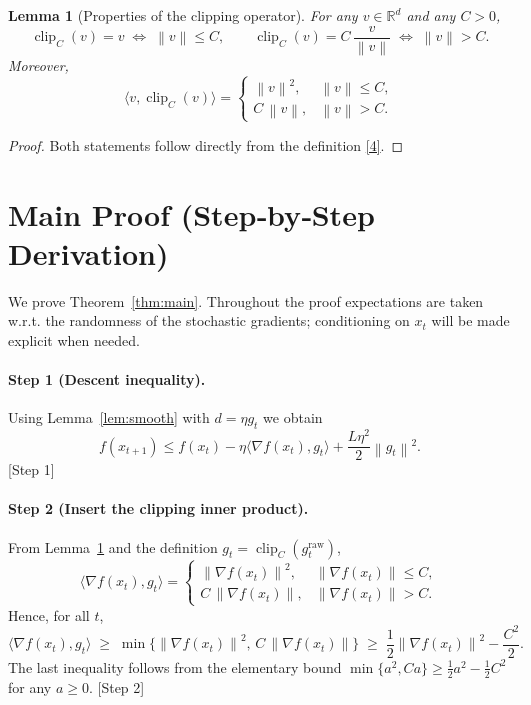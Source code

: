 \documentclass{article}
\newtheorem{lemma}{Lemma}
\newcommand{\norm}[1]{\left\lVert#1\right\rVert}
\begin{document}
\begin{lemma}[Properties of the clipping operator]\label{lem:clip}
For any $v\in\mathbb{R}^d$ and any $C>0$,
\[
\operatorname{clip}_C(v)=v\;\Longleftrightarrow\;\norm{v}\le C,
\qquad
\operatorname{clip}_C(v)=C\,\frac{v}{\norm{v}}\;\Longleftrightarrow\;\norm{v}>C .
\tag{4}
\]
Moreover,
\[
\langle v,\operatorname{clip}_C(v)\rangle
=
\begin{cases}
\norm{v}^{2}, & \norm{v}\le C,\\[4pt]
C\,\norm{v}, & \norm{v}> C .
\end{cases}
\tag{5}
\]
\end{lemma}
\begin{proof}
Both statements follow directly from the definition \eqref{4}.
\end{proof}

\section*{Main Proof (Step‑by‑Step Derivation)}
We prove Theorem~\ref{thm:main}.  Throughout the proof expectations are
taken w.r.t. the randomness of the stochastic gradients; conditioning on
$x_t$ will be made explicit when needed.

\paragraph{Step 1 (Descent inequality).}
Using Lemma~\ref{lem:smooth} with $d=\eta g_t$ we obtain
\[
f(x_{t+1})\le
f(x_t)-\eta\langle\nabla f(x_t),g_t\rangle
+\frac{L\eta^{2}}{2}\norm{g_t}^{2}.
\tag{6}
\]
[Step 1]

\paragraph{Step 2 (Insert the clipping inner product).}
From Lemma~\ref{lem:clip} and the definition $g_t=\operatorname{clip}_C(g^{\text{raw}}_t)$,
\[
\langle\nabla f(x_t),g_t\rangle
=
\begin{cases}
\norm{\nabla f(x_t)}^{2}, & \norm{\nabla f(x_t)}\le C,\\[4pt]
C\,\norm{\nabla f(x_t)}, & \norm{\nabla f(x_t)}> C .
\end{cases}
\tag{7}
\]
Hence, for all $t$,
\[
\langle\nabla f(x_t),g_t\rangle\;\ge\;
\min\bigl\{\norm{\nabla f(x_t)}^{2},\,C\,\norm{\nabla f(x_t)}\bigr\}
\;\ge\;
\frac{1}{2}\norm{\nabla f(x_t)}^{2}
-\frac{C^{2}}{2}.
\tag{8}
\]
The last inequality follows from the elementary bound
$\min\{a^{2},Ca\}\ge\frac12 a^{2}-\frac12 C^{2}$ for any $a\ge0$.
[Step 2]
\end{document}
